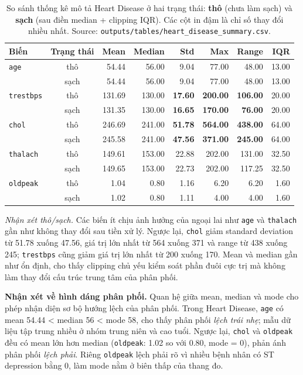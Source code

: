 \begin{table}[H]
\centering
\caption[Thống kê thô/sạch Heart Disease]{So sánh thống kê mô tả Heart Disease ở hai trạng thái: \textbf{thô} (chưa làm sạch) và \textbf{sạch} (sau điền median + clipping IQR). Các cột in đậm là chỉ số thay đổi nhiều nhất. Source: \texttt{outputs/tables/heart\_disease\_summary.csv}.}
\label{tab:ch4_heart_stats_raw_clean}
\footnotesize
\setlength{\tabcolsep}{4pt}
\begin{tabular}{lcrrrrrr}
\toprule
Biến & Trạng thái & Mean & Median & \textbf{Std} & \textbf{Max} & \textbf{Range} & IQR \\
\midrule
\texttt{age} & thô & 54.44 & 56.00 & 9.04 & 77.00 & 48.00 & 13.00 \\
 & sạch & 54.44 & 56.00 & 9.04 & 77.00 & 48.00 & 13.00 \\
\midrule
\texttt{trestbps} & thô & 131.69 & 130.00 & \textbf{17.60} & \textbf{200.00} & \textbf{106.00} & 20.00 \\
 & sạch & 131.35 & 130.00 & \textbf{16.65} & \textbf{170.00} & \textbf{76.00} & 20.00 \\
\midrule
\texttt{chol} & thô & 246.69 & 241.00 & \textbf{51.78} & \textbf{564.00} & \textbf{438.00} & 64.00 \\
 & sạch & 245.58 & 241.00 & \textbf{47.56} & \textbf{371.00} & \textbf{245.00} & 64.00 \\
\midrule
\texttt{thalach} & thô & 149.61 & 153.00 & 22.88 & 202.00 & 131.00 & 32.50 \\
 & sạch & 149.65 & 153.00 & 22.73 & 202.00 & 117.25 & 32.50 \\
\midrule
\texttt{oldpeak} & thô & 1.04 & 0.80 & 1.16 & 6.20 & 6.20 & 1.60 \\
 & sạch & 1.02 & 0.80 & 1.11 & 4.00 & 4.00 & 1.60 \\
\bottomrule
\end{tabular}
\end{table}

\textit{Nhận xét thô/sạch.} Các biến ít chịu ảnh hưởng của ngoại lai như \texttt{age} và \texttt{thalach} gần như không thay đổi sau tiền xử lý. Ngược lại, \texttt{chol} giảm standard deviation từ 51.78 xuống 47.56, giá trị lớn nhất từ 564 xuống 371 và range từ 438 xuống 245; \texttt{trestbps} cũng giảm giá trị lớn nhất từ 200 xuống 170. Mean và median gần như ổn định, cho thấy clipping chủ yếu kiểm soát phần đuôi cực trị mà không làm thay đổi cấu trúc trung tâm của phân phối.

\textbf{Nhận xét về hình dáng phân phối.} Quan hệ giữa mean, median và mode cho phép nhận diện sơ bộ hướng lệch của phân phối. Trong Heart Disease, \texttt{age} có mean 54.44 \textless{} median 56 \textless{} mode 58, cho thấy phân phối \emph{lệch trái nhẹ}; mẫu dữ liệu tập trung nhiều ở nhóm trung niên và cao tuổi. Ngược lại, \texttt{chol} và \texttt{oldpeak} đều có mean lớn hơn median (\texttt{oldpeak}: 1.02 so với 0.80, mode = 0), phản ánh phân phối \emph{lệch phải}. Riêng \texttt{oldpeak} lệch phải rõ vì nhiều bệnh nhân có ST depression bằng 0, làm mode nằm ở biên thấp của thang đo.

